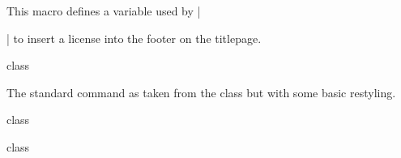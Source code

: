 \documentclass{skdoc}
\begin{document}
	\begin{macro}{\license}
	This macro defines a variable used by |\maketitle| to insert a 
	license into the footer on the titlepage.
	\begin{macro*}{\@copyright}
\begin{MacroCode}{class}
\def\@copyright{\relax}
\newcommand{\license}[1]{\gdef\@copyright{#1}}
\end{MacroCode}
	\end{macro*}
	\end{macro}

	\begin{macro}{\maketitle}
	The standard  command as taken from the 
	class but with some basic restyling.
\begin{MacroCode}{class}
\let\@smallprintstyle\relax
\newcommand\maketitle{\par%
  \begingroup
    \renewcommand\thefootnote{\@fnsymbol\c@footnote}%
    \def\@makefnmark{\rlap{\@textsuperscript{\normalfont\@thefnmark}}}%
    \long\def\@makefntext##1{\parindent 1em\noindent%
      \hb@xt@1.8em{\hss\@textsuperscript{\normalfont\@thefnmark}}##1}%
    \newpage
    \global\@topnum\z@
    \@maketitle
    \thispagestyle{plain}\@thanks
  \endgroup
  \setcounter{footnote}{0}%
}
\end{MacroCode}
	\end{macro}
	\begin{macro*}{\@maketitle}
\begin{MacroCode}{class}
\def\@maketitle{%
  \newpage
  \null
  \begin{flushleft}%
		\vspace{-\headsep}
    {\small%
      \@smallprintstyle
      \if\@regarding\relax\else\@regarding{, }\fi%
      \@date\par%
    }%
    \vspace{1.5cm}%
    {\Huge\@titstyle\@title\par}%
    \vspace{.125cm}%
    {\Large\@titstyle\@author}%
    \vspace{.75cm}%
  \end{flushleft}%
  \par%
}
\end{MacroCode}
	\end{macro*}
\end{document}
